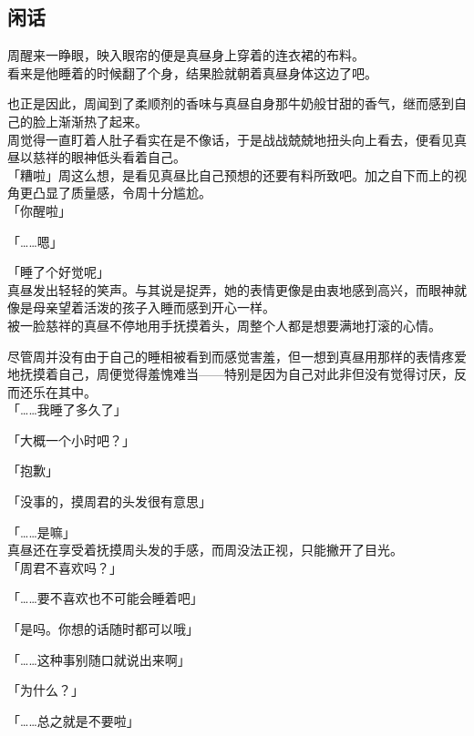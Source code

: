 \subsection{闲话}

周醒来一睁眼，映入眼帘的便是真昼身上穿着的连衣裙的布料。\\

看来是他睡着的时候翻了个身，结果脸就朝着真昼身体这边了吧。

也正是因此，周闻到了柔顺剂的香味与真昼自身那牛奶般甘甜的香气，继而感到自己的脸上渐渐热了起来。\\

周觉得一直盯着人肚子看实在是不像话，于是战战兢兢地扭头向上看去，便看见真昼以慈祥的眼神低头看着自己。\\

「糟啦」周这么想，是看见真昼比自己预想的还要有料所致吧。加之自下而上的视角更凸显了质量感，令周十分尴尬。\\

「你醒啦」

「……嗯」

「睡了个好觉呢」\\

真昼发出轻轻的笑声。与其说是捉弄，她的表情更像是由衷地感到高兴，而眼神就像是母亲望着活泼的孩子入睡而感到开心一样。\\

被一脸慈祥的真昼不停地用手抚摸着头，周整个人都是想要满地打滚的心情。

尽管周并没有由于自己的睡相被看到而感觉害羞，但一想到真昼用那样的表情疼爱地抚摸着自己，周便觉得羞愧难当——特别是因为自己对此非但没有觉得讨厌，反而还乐在其中。\\

「……我睡了多久了」

「大概一个小时吧？」

「抱歉」

「没事的，摸周君的头发很有意思」

「……是嘛」\\

真昼还在享受着抚摸周头发的手感，而周没法正视，只能撇开了目光。\\

「周君不喜欢吗？」

「……要不喜欢也不可能会睡着吧」

「是吗。你想的话随时都可以哦」

「……这种事别随口就说出来啊」

「为什么？」

「……总之就是不要啦」\\

